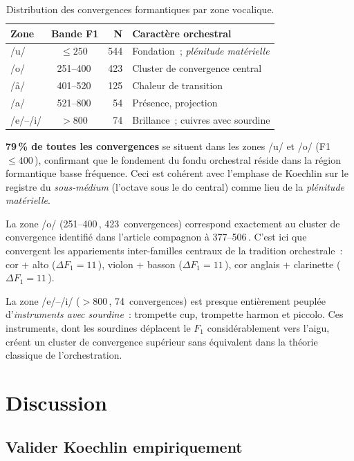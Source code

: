 \documentclass[journal]{IEEEtran}
\newcommand{\Hz}{\,\text{Hz}}
\begin{document}
\begin{table}[!t]
\centering
\caption{Distribution des convergences formantiques par zone vocalique.}
\label{tab:zones}
\begin{tabular}{@{}lcrl@{}}
\toprule
\textbf{Zone} & \textbf{Bande F1} & \textbf{N} & \textbf{Caractère orchestral} \\
\midrule
/u/       & $\leq 250$\Hz    & 544 & Fondation~; \textit{plénitude matérielle} \\
/o/       & 251--400\Hz      & 423 & Cluster de convergence central \\
/\aa/     & 401--520\Hz      & 125 & Chaleur de transition \\
/a/       & 521--800\Hz      & 54  & Présence, projection \\
/e/--/i/  & $> 800$\Hz       & 74  & Brillance~; cuivres avec sourdine \\
\bottomrule
\end{tabular}
\end{table}

\textbf{79\,\% de toutes les convergences} se situent dans les zones /u/ et /o/ (F1 $\leq 400$\Hz), confirmant que le fondement du fondu orchestral réside dans la région formantique basse fréquence. Ceci est cohérent avec l'emphase de Koechlin sur le registre du \textit{sous-médium} (l'octave sous le do central) comme lieu de la \textit{plénitude matérielle}.

La zone /o/ (251--400\Hz, 423~convergences) correspond exactement au cluster de convergence identifié dans l'article compagnon à 377--506\Hz. C'est ici que convergent les appariements inter-familles centraux de la tradition orchestrale~: cor + alto ($\Delta F_1 = 11$\Hz), violon + basson ($\Delta F_1 = 11$\Hz), cor anglais + clarinette ($\Delta F_1 = 11$\Hz).

La zone /e/--/i/ ($> 800$\Hz, 74~convergences) est presque entièrement peuplée d'\emph{instruments avec sourdine}~: trompette cup, trompette harmon et piccolo. Ces instruments, dont les sourdines déplacent le $F_1$ considérablement vers l'aigu, créent un \og cluster de convergence supérieur \fg{} sans équivalent dans la théorie classique de l'orchestration.

\section{Discussion}
\label{sec:discussion}

\subsection{Valider Koechlin empiriquement}
\end{document}
